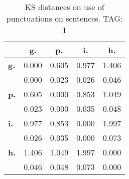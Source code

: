 \begin{table}[h!]
\begin{center}
\begin{tabular}{| l || c | c | c | c |}\hline
 & {\bf g.} & {\bf p.} & {\bf i.} & {\bf h.} \\\hline\hline
{\bf g.} & 0.000 & 0.605 & 0.977 & 1.406 \\
{\bf } & 0.000 & 0.023 & 0.026 & 0.046 \\\hline
{\bf p.} & 0.605 & 0.000 & 0.853 & 1.049 \\
{\bf } & 0.023 & 0.000 & 0.035 & 0.048 \\\hline
{\bf i.} & 0.977 & 0.853 & 0.000 & 1.997 \\
{\bf } & 0.026 & 0.035 & 0.000 & 0.073 \\\hline
{\bf h.} & 1.406 & 1.049 & 1.997 & 0.000 \\
{\bf } & 0.046 & 0.048 & 0.073 & 0.000 \\\hline
\end{tabular}
\caption{KS distances on use of punctuations on sentences. TAG: 1}
\end{center}
\end{table}